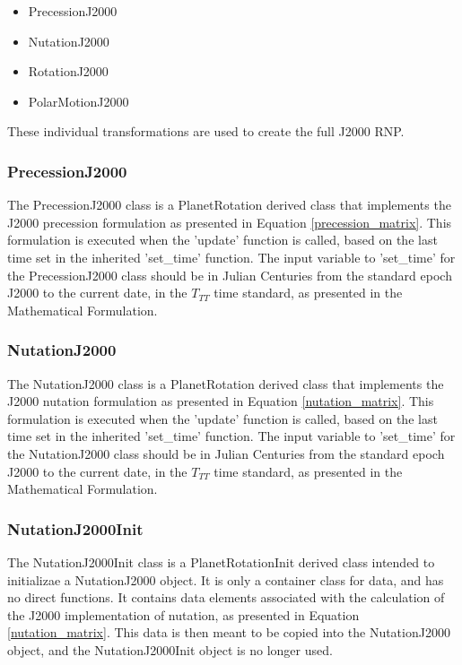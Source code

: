 \begin{itemize}
\item{PrecessionJ2000}
\item{NutationJ2000}
\item{RotationJ2000}
\item{PolarMotionJ2000}
\end{itemize}

These individual transformations are used to create the full J2000 RNP.

\subsubsection{PrecessionJ2000}

The PrecessionJ2000 class is a PlanetRotation derived class that implements the
J2000 precession formulation as presented in Equation \eqref{precession_matrix}.
This formulation is executed when the 'update' function is called, based
on the last time set in the inherited 'set\_time' function. The input
variable to 'set\_time' for the PrecessionJ2000 class should be in
Julian Centuries from the standard epoch J2000 to the current date, in the
$T_{TT}$ time standard, as presented in the Mathematical Formulation.

\subsubsection{NutationJ2000}

The NutationJ2000 class is a PlanetRotation derived class that implements the
J2000 nutation formulation as presented in Equation \eqref{nutation_matrix}.
This formulation is executed when the 'update' function is called, based
on the last time set in the inherited 'set\_time' function. The input
variable to 'set\_time' for the NutationJ2000 class should be in
Julian Centuries from the standard epoch J2000 to the current date, in the
$T_{TT}$ time standard, as presented in the Mathematical Formulation.


\subsubsection{NutationJ2000Init}

The NutationJ2000Init class is a PlanetRotationInit derived class
intended to initializae a NutationJ2000 object. It is only a container
class for data, and has no direct functions. It contains data
elements associated with the calculation of the J2000 implementation
of nutation, as presented in Equation \eqref{nutation_matrix}. This data
is then meant to be copied into the NutationJ2000 object, and the
NutationJ2000Init object is no longer used.

